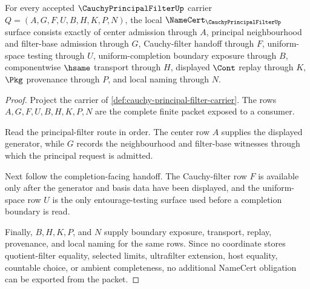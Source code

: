 \begin{theorem}
\label{thm:cauchy-principal-filter-namecert-obligations}
For every accepted $\CauchyPrincipalFilterUp$ carrier $Q=(A,G,F,U,B,H,K,P,N)$, the local $\NameCert_{\CauchyPrincipalFilterUp}$ surface consists exactly of center admission through $A$, principal neighbourhood and filter-base admission through $G$, Cauchy-filter handoff through $F$, uniform-space testing through $U$, uniform-completion boundary exposure through $B$, componentwise $\hsame$ transport through $H$, displayed $\Cont$ replay through $K$, $\Pkg$ provenance through $P$, and local naming through $N$.
\end{theorem}
\begin{proof}
Project the carrier of \autoref{def:cauchy-principal-filter-carrier}. The rows $A,G,F,U,B,H,K,P,N$ are the complete finite packet exposed to a consumer.

Read the principal-filter route in order. The center row $A$ supplies the displayed generator, while $G$ records the neighbourhood and filter-base witnesses through which the principal request is admitted.

Next follow the completion-facing handoff. The Cauchy-filter row $F$ is available only after the generator and basis data have been displayed, and the uniform-space row $U$ is the only entourage-testing surface used before a completion boundary is read.

Finally, $B,H,K,P$, and $N$ supply boundary exposure, transport, replay, provenance, and local naming for the same rows. Since no coordinate stores quotient-filter equality, selected limits, ultrafilter extension, host equality, countable choice, or ambient completeness, no additional NameCert obligation can be exported from the packet.
\end{proof}

